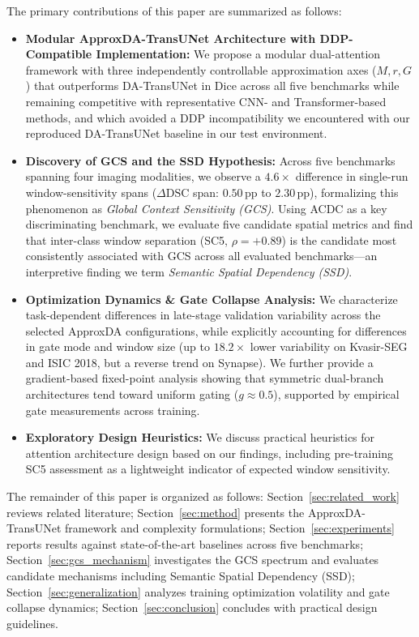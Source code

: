 The primary contributions of this paper are summarized as follows:
\begin{itemize}
  \item \textbf{Modular ApproxDA-TransUNet Architecture with DDP-Compatible Implementation:} We propose a modular dual-attention framework with three independently controllable approximation axes ($M, r, G$) that outperforms DA-TransUNet in Dice across all five benchmarks while remaining competitive with representative CNN- and Transformer-based methods, and which avoided a DDP incompatibility we encountered with our reproduced DA-TransUNet baseline in our test environment.
  \item \textbf{Discovery of GCS and the SSD Hypothesis:} Across five benchmarks spanning four imaging modalities, we observe a $4.6\times$ difference in single-run window-sensitivity spans ($\Delta\text{DSC}$ span: $0.50$\,pp to $2.30$\,pp), formalizing this phenomenon as \emph{Global Context Sensitivity (GCS)}. Using ACDC as a key discriminating benchmark, we evaluate five candidate spatial metrics and find that inter-class window separation (SC5, $\rho{=}+0.89$) is the candidate most consistently associated with GCS across all evaluated benchmarks---an interpretive finding we term \emph{Semantic Spatial Dependency (SSD)}.
  \item \textbf{Optimization Dynamics \& Gate Collapse Analysis:} We characterize task-dependent differences in late-stage validation variability across the selected ApproxDA configurations, while explicitly accounting for differences in gate mode and window size (up to $18.2\times$ lower variability on Kvasir-SEG and ISIC 2018, but a reverse trend on Synapse). We further provide a gradient-based fixed-point analysis showing that symmetric dual-branch architectures tend toward uniform gating ($g \approx 0.5$), supported by empirical gate measurements across training.
  \item \textbf{Exploratory Design Heuristics:} We discuss practical heuristics for attention architecture design based on our findings, including pre-training SC5 assessment as a lightweight indicator of expected window sensitivity.
\end{itemize}

The remainder of this paper is organized as follows: Section~\ref{sec:related_work} reviews related literature; Section~\ref{sec:method} presents the ApproxDA-TransUNet framework and complexity formulations; Section~\ref{sec:experiments} reports results against state-of-the-art baselines across five benchmarks; Section~\ref{sec:gcs_mechanism} investigates the GCS spectrum and evaluates candidate mechanisms including Semantic Spatial Dependency (SSD); Section~\ref{sec:generalization} analyzes training optimization volatility and gate collapse dynamics; Section~\ref{sec:conclusion} concludes with practical design guidelines.
